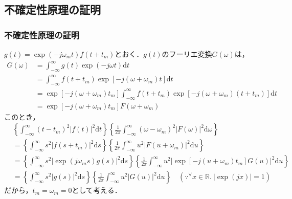 \documentclass[dvipdfmx,graphicx,14pt]{beamer}
\begin{document}
\subsection{不確定性原理の証明} 

\begin{frame}[c]
    \frametitle{不確定性原理の証明}
    \scriptsize
    $g(t) = \exp(-j\omega_{m}t) f(t + t_{m})$とおく．$g(t)$のフーリエ変換$G(\omega)$は，
    \begin{align*}
        G(\omega) &= \int^{\infty}_{-\infty} g(t) \exp(-j\omega t) \mathrm{d}t \\
        &= \int^{\infty}_{-\infty} f(t + t_{m}) \exp[-j(\omega + \omega_{m}) t] \mathrm{d}t \\
        &= \exp[-j(\omega + \omega_{m}) t_{m}] \int^{\infty}_{-\infty} f(t + t_{m}) \exp[-j(\omega + \omega_{m}) (t + t_{m})] \mathrm{d}t \\
        &= \exp[-j(\omega + \omega_{m}) t_{m}] F(\omega + \omega_{m})
    \end{align*}
    このとき，
    \begin{align*}
        & \left\{ \int_{-\infty}^{\infty} (t - t_{m})^{2} |f(t)|^{2} \mathrm{d}t \right\} \left\{ \frac{1}{2\pi} \int_{-\infty}^{\infty} (\omega - \omega_{m})^{2} |F(\omega)|^{2} \mathrm{d}\omega \right\} \\
        &= \left\{ \int_{-\infty}^{\infty} s^{2} |f(s + t_{m})|^{2} \mathrm{d}s \right\} \left\{ \frac{1}{2\pi} \int_{-\infty}^{\infty} u^{2} |F(u + \omega_{m})|^{2} \mathrm{d}u \right\} \\
        &= \left\{ \int_{-\infty}^{\infty} s^{2} |\exp(j\omega_{m}s)g(s)|^{2} \mathrm{d}s \right\} \left\{ \frac{1}{2\pi} \int_{-\infty}^{\infty} u^{2} |\exp[-j(u+\omega_{m})t_{m}]G(u)|^{2} \mathrm{d}u \right\} \\
        &= \left\{ \int_{-\infty}^{\infty} s^{2} |g(s)|^{2} \mathrm{d}s \right\} \left\{ \frac{1}{2\pi} \int_{-\infty}^{\infty} u^{2} |G(u)|^{2} \mathrm{d}u \right\} \quad (\because {}^{\forall} x \in \mathbb{R}.\ |\exp(jx)| = 1)
    \end{align*}
    だから，$t_{m} = \omega_{m} = 0$として考える．
\end{frame}
\end{document}
